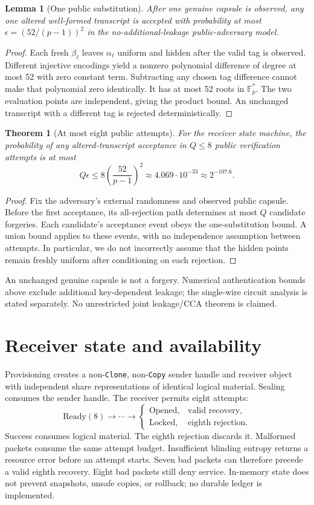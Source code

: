 \documentclass[11pt]{article}
\newtheorem{theorem}{Theorem}
\newtheorem{lemma}{Lemma}
\newcommand{\F}{\mathbb F_p}
\begin{document}
\begin{lemma}[One public substitution]
After one genuine capsule is observed, any one altered well-formed
transcript is accepted with probability at most
$\epsilon=(52/(p-1))^2$ in the no-additional-leakage public-adversary model.
\end{lemma}
\begin{proof}
Each fresh $\beta_\ell$ leaves $\alpha_\ell$ uniform and hidden after the
valid tag is observed. Different injective encodings yield a nonzero
polynomial difference of degree at most 52 with zero constant term.
Subtracting any chosen tag difference cannot make that polynomial zero
identically. It has at most 52 roots in $\F^\ast$.
The two evaluation points are independent, giving the product bound.
An unchanged transcript with a different tag is rejected deterministically.
\end{proof}

\begin{theorem}[At most eight public attempts]
For the receiver state machine, the probability of any altered-transcript
acceptance in $Q\le8$ public verification attempts is at most
\[
Q\epsilon\le8\left(\frac{52}{p-1}\right)^2
\approx4.069\cdot10^{-33}\approx2^{-107.6}.
\]
\end{theorem}
\begin{proof}
Fix the adversary's external randomness and observed public capsule.
Before the first acceptance, its all-rejection path determines at most
$Q$ candidate forgeries. Each candidate's acceptance event obeys the
one-substitution bound. A union bound applies to these events, with no
independence assumption between attempts. In particular, we do not
incorrectly assume that the hidden points remain freshly uniform after
conditioning on each rejection.
\end{proof}
An unchanged genuine capsule is not a forgery. Numerical authentication
bounds above exclude additional key-dependent leakage; the single-wire
circuit analysis is stated separately. No unrestricted joint leakage/CCA
theorem is claimed.

\section{Receiver state and availability}
Provisioning creates a non-\texttt{Clone}, non-\texttt{Copy} sender handle
and receiver object with independent share representations of identical
logical material. Sealing consumes the sender handle. The receiver permits
eight attempts:
\[
\mathrm{Ready}(8)\longrightarrow\cdots\longrightarrow
\begin{cases}
\mathrm{Opened},&\text{valid recovery},\\
\mathrm{Locked},&\text{eighth rejection}.
\end{cases}
\]
Success consumes logical material. The eighth rejection discards it.
Malformed packets consume the same attempt budget. Insufficient blinding
entropy returns a resource error before an attempt starts.
Seven bad packets can therefore precede a valid eighth recovery.
Eight bad packets still deny service. In-memory state does not prevent
snapshots, unsafe copies, or rollback; no durable ledger is implemented.
\end{document}
